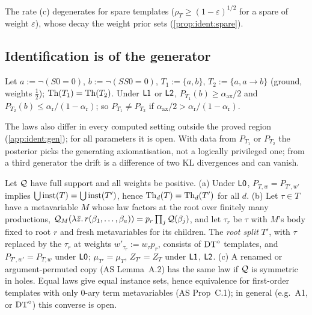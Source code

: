 \noindent The rate (c) degenerates for spare templates ($\rho_T\ge(1-\varepsilon)^{1/2}$ for a spare of weight $\varepsilon$), whose decay the weight prior sets (\cref{prop:ident:spare}).

\subsection{Identification is of the generator}\label{sec:ident:gen}

\begin{proposition}\identbrk{}\label{prop:ident:sep}
Let $a:=\neg(S0=0)$, $b:=\neg(SS0=0)$, $T_1:=\{a,b\}$, $T_2:=\{a,a\to b\}$ (ground, weights $\frac12$); $\mathrm{Th}(T_1)=\mathrm{Th}(T_2)$. Under $\mathord{\mathsf{L1}}$ or $\mathord{\mathsf{L2}}$, $P_{T_1}(b)\ge\alpha_{\mathrm{ax}}/2$ and $P_{T_2}(b)\le\alpha_{\mathrm r}/(1-\alpha_{\mathrm r})$; so $P_{T_1}\ne P_{T_2}$ if $\alpha_{\mathrm{ax}}/2>\alpha_{\mathrm r}/(1-\alpha_{\mathrm r})$.
\end{proposition}

\noindent The laws also differ in every computed setting outside the proved region (\cref{app:ident:gen}); for all parameters it is open. With data from $P_{T_1}$ or $P_{T_2}$ the posterior picks the generating axiomatisation, not a logically privileged one; from a third generator the drift is a difference of two KL divergences and can vanish.

\begin{proposition}\identbrk{}\label{prop:ident:splits}
Let $\mathcal{Q}$ have full support and all weights be positive.
(a) Under $\mathord{\mathsf{L0}}$, $P_{T,w}=P_{T',w'}$ implies $\bigcup\mathrm{inst}(T)=\bigcup\mathrm{inst}(T')$, hence $\mathrm{Th}_d(T)=\mathrm{Th}_d(T')$ for all $d$.
(b) Let $\tau\in T$ have a metavariable $M$ whose law factors at the root over finitely many productions, $\mathcal{Q}_M(\lambda\bar z.\,r(\beta_1,\dots,\beta_a))=p_r\prod_j\mathcal{Q}(\beta_j)$, and let $\tau_r$ be $\tau$ with $M$'s body fixed to root $r$ and fresh metavariables for its children. The \emph{root split} $T'$, with $\tau$ replaced by the $\tau_r$ at weights $w'_{\tau_r}:=w_\tau p_r$, consists of $\mathrm{DT}^{\circ}$ templates, and $P_{T',w'}=P_{T,w}$ under $\mathord{\mathsf{L0}}$; $\mu_{T'}=\mu_T$, $Z_{T'}=Z_T$ under $\mathord{\mathsf{L1}}$, $\mathord{\mathsf{L2}}$.
(c) A renamed or argument-permuted copy (AS Lemma~A.2) has the same law if $\mathcal{Q}$ is symmetric in holes. Equal laws give equal instance sets, hence equivalence for first-order templates with only $0$-ary term metavariables (AS Prop~C.1); in general (e.g.\ A1, or $\mathrm{DT}^{\circ}$) this converse is open.
\end{proposition}

